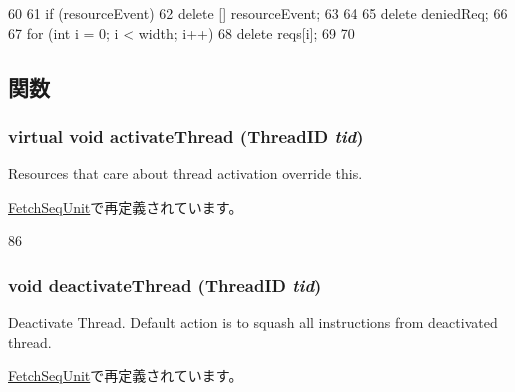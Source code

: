 \begin{DoxyCode}
60 {
61     if (resourceEvent) {
62         delete [] resourceEvent;
63     }
64 
65     delete deniedReq;
66 
67     for (int i = 0; i < width; i++) {
68         delete reqs[i];
69     }
70 }
\end{DoxyCode}


\subsection{関数}
\hypertarget{classResource_ab75d2f4e158982d66b44263d96cdd058}{
\subsubsection[{activateThread}]{\setlength{\rightskip}{0pt plus 5cm}virtual void activateThread ({\bf ThreadID} {\em tid})}}
\label{classResource_ab75d2f4e158982d66b44263d96cdd058}
Resources that care about thread activation override this. 

\hyperlink{classFetchSeqUnit_a687aa4600423bb30ecf3bb1da6cd6000}{FetchSeqUnit}で再定義されています。


\begin{DoxyCode}
86 { }
\end{DoxyCode}
\hypertarget{classResource_ad11d9216ad92d9036ebf37844cf6e706}{
\subsubsection[{deactivateThread}]{\setlength{\rightskip}{0pt plus 5cm}void deactivateThread ({\bf ThreadID} {\em tid})}}
\label{classResource_ad11d9216ad92d9036ebf37844cf6e706}
Deactivate Thread. Default action is to squash all instructions from deactivated thread. 

\hyperlink{classFetchSeqUnit_ad11d9216ad92d9036ebf37844cf6e706}{FetchSeqUnit}で再定義されています。


